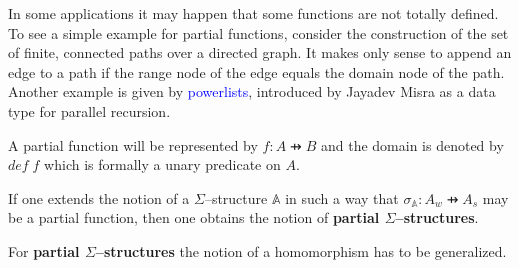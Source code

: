 \documentclass[landscape, autoslides, light]{mmiss}
\newcommand{\ns}{\normalsize}
\begin{document}
\begin{Package}[Label={FSDPT}, Title={Formal Specification of Data and Process Types}, ShortTitle={FSDPT}, Authors={Horst Reichel}, Date={February 2003}, LevelOfDetail=Lecture, Language=en-GB]
\begin{Section}[Title={Initial Algebras as Data Types}, Label={section3}]
\begin{Section}[Title={Generic Specifications}, Label={section3_4}]
\begin{Paragraph}[Title={Parameter instantiation}, Label=Paragraph69]

\end{Paragraph}
\end{Section}
\begin{Section}[Title={Partial Constructors}, Label={section3_5}]
\begin{Paragraph}

\ns

 In some applications it may happen that some functions are not
totally defined. To see a simple example for partial functions,
consider the construction of the set of finite, connected paths
over a directed graph. It makes only sense to append an edge to a
path if the range node of the edge equals the domain node of the
path. Another example is given by \textcolor{blue}{powerlists},
introduced by Jayadev Misra as a data type for parallel recursion.


\end{Paragraph}
\begin{Paragraph}[Title={basic notions}, Label=Paragraph70]

A partial function will be represented by $f : A \pfun B$ and the
domain is denoted by $def \; f $ which is formally a unary
predicate on $A$.

If one extends the notion of a $\Sigma$--structure  $ \mathbb{A}$
in such a way that $\sigma_{ \mathbb{A}}: A_w \pfun A_s$ may be a
partial function, then one obtains the notion of \textbf{partial
$\Sigma$--structures}.



For \textbf{partial $\Sigma$--structures} the notion of a
homomorphism has to be generalized.

\end{Paragraph}
\begin{Paragraph}[Label=Paragraph71]


\end{Paragraph}
\end{Section}
\end{Section}
\end{Package}
\end{document}
